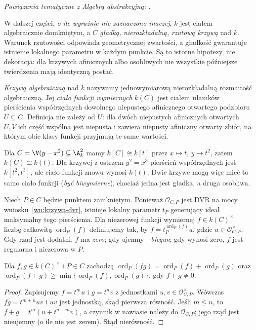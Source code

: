 \noindent\emph{Powiązania tematyczne z Algebrą abstrakcyjną:} .


W dalszej części, \emph{o ile wyraźnie nie zaznaczono
inaczej}, $k$ jest ciałem algebraicznie domkniętym,
a $C$ \emph{gładką, nierozkładalną, rzutową krzywą}
nad $k$. Warunek rzutowości odpowiada geometrycznej
zwartości, a gładkość gwarantuje istnienie lokalnego
parametru w każdym punkcie. Są to istotne hipotezy,
nie dekoracja: dla krzywych afinicznych albo osobliwych
nie wszystkie późniejsze twierdzenia mają identyczną postać.

\begin{definicja}
\emph{Krzywą algebraiczną} nad $k$ nazywamy
jednowymiarową nierozkładalną rozmaitość algebraiczną.
Jej \emph{ciało funkcji wymiernych} $k(C)$ jest
ciałem ułamków pierścienia współrzędnych dowolnego
niepustego afinicznego otwartego podzbioru $U\subseteq C$.
Definicja nie zależy od $U$: dla dwóch niepustych
afinicznych otwartych $U,V$ ich część wspólna jest
niepusta i zawiera niepusty afiniczny otwarty zbiór,
na którym obie klasy funkcji przyjmują te same wartości.
\end{definicja}

\begin{przyklad}
Dla $C=\V(y-x^2)\subseteq\A^2_k$ mamy
$k[C]\cong k[t]$ przez $x\mapsto t$, $y\mapsto t^2$,
zatem $k(C)\cong k(t)$. Dla krzywej z ostrzem
$y^2=x^3$ pierścień współrzędnych jest
$k[t^2,t^3]$, ale ciało funkcji znowu wynosi $k(t)$.
Dwie krzywe mogą więc mieć to samo ciało funkcji
(\emph{być biwymierne}), chociaż jedna jest gładka,
a druga osobliwa.
\end{przyklad}

\begin{definicja}
\label{def:ord}
Niech $P\in C$ będzie punktem zamkniętym.
Ponieważ $\mathcal O_{C,P}$ jest DVR na mocy
wniosku~\ref{wn:krzywa-dvr}, istnieje lokalny parametr
$t_P$ generujący ideał maksymalny tego pierścienia.
Dla niezerowej funkcji wymiernej $f\in k(C)^\times$
liczbę całkowitą $\operatorname{ord}_P(f)$ definiujemy
tak, by $f=t_P^{\operatorname{ord}_P(f)}u$,
gdzie $u\in\mathcal O_{C,P}^\times$.
Gdy rząd jest dodatni, $f$ ma \emph{zero}; gdy
ujemny---\emph{biegun}; gdy wynosi zero, $f$
jest regularna i niezerowa w $P$.
\end{definicja}

\begin{stwierdzenie}
Dla $f,g\in k(C)^\times$ i $P\in C$ zachodzą
$\operatorname{ord}_P(fg)=\operatorname{ord}_P(f)+
\operatorname{ord}_P(g)$ oraz
$\operatorname{ord}_P(f+g)\ge\min
\{\operatorname{ord}_P(f),\operatorname{ord}_P(g)\}$,
gdy $f+g\ne0$.
\end{stwierdzenie}
\begin{proof}
Zapisujemy $f=t^m u$ i $g=t^n v$ z jednostkami
$u,v\in\mathcal O_{C,P}^\times$. Wówczas
$fg=t^{m+n}uv$ i $uv$ jest jednostką, skąd
pierwsza równość. Jeśli $m\le n$, to
$f+g=t^m(u+t^{n-m}v)$, a czynnik w nawiasie
należy do $\mathcal O_{C,P}$; jego rząd jest
nieujemny (o ile nie jest zerem). Stąd nierówność.
\end{proof}

